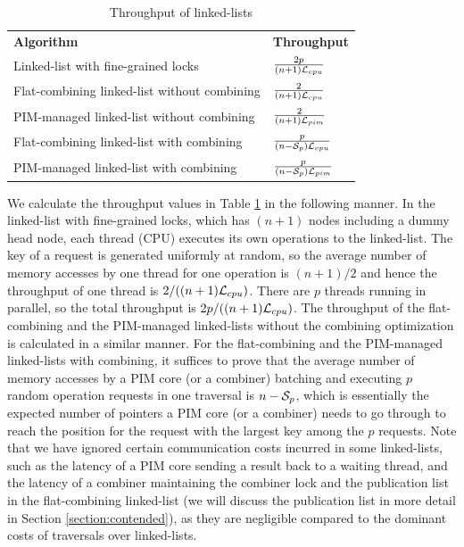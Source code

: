 \renewcommand{\arraystretch}{1.6}
\begin{table}[ht!]
\begin{center}
    \begin{tabular}{| >{\small}l | l |}
    \hline
    \textbf{Algorithm} & \textbf{Throughput}\\ \hhline{|=|=|}
    Linked-list with fine-grained locks & ${2p \over (n+1)\mathcal{L}_{cpu}}$ \\ \hline
    Flat-combining linked-list without combining & ${2 \over (n+1)\mathcal{L}_{cpu}}$ \\ \hline
    PIM-managed linked-list without combining & ${2 \over (n+1)\mathcal{L}_{pim}}$ \\ \hline
    Flat-combining linked-list with combining & ${p \over (n-\mathcal{S}_{p})\mathcal{L}_{cpu}}$ \\ \hline
    PIM-managed linked-list with combining & ${p \over (n-\mathcal{S}_{p})\mathcal{L}_{pim}}$ \\ \hline
    \end{tabular}
\end{center}
\caption{Throughput of linked-lists}
\label{tab:linkedlist}
\end{table}

We calculate the throughput values in Table \ref{tab:linkedlist} in
the following manner.  In the linked-list with fine-grained locks,
which has $(n+1)$ nodes including a dummy head node, each thread (CPU)
executes its own operations to the linked-list.  The key of a request
is generated uniformly at random, so the average number of memory
accesses by one thread for one operation is $(n+1)/2$ and hence the
throughput of one thread is $2/((n+1)\mathcal{L}_{cpu})$.  There are $p$ threads
running in parallel, so the total throughput is $2p/((n+1)\mathcal{L}_{cpu})$.
The throughput of the flat-combining and the PIM-managed linked-lists
without the combining optimization is calculated in a similar manner.
For the flat-combining and the PIM-managed linked-lists with
combining, it suffices to prove that the average number of memory
accesses by a PIM core (or a combiner) batching and executing $p$
random operation requests in one traversal is $n - \mathcal{S}_{p}$, which is
essentially the expected number of pointers a PIM core (or a combiner)
needs to go through to reach the position for the request with the
largest key among the $p$ requests.  Note that we have ignored certain
communication costs incurred in some linked-lists, such as the latency
of a PIM core sending a result back to a waiting thread, and the
latency of a combiner maintaining the combiner lock and the
publication list in the flat-combining linked-list (we will discuss
the publication list in more detail in Section
\ref{section:contended}), as they are negligible compared to the
dominant costs of traversals over linked-lists.
 
